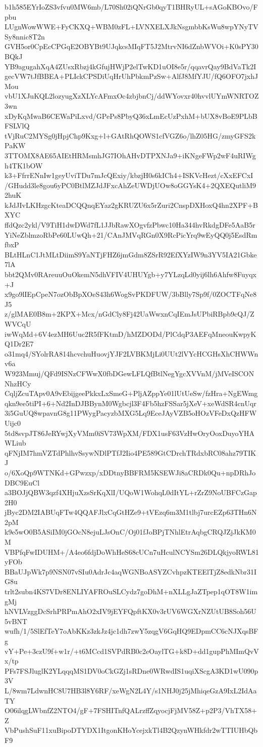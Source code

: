 b1h585EYrIoZS3vfvu0MW6mb/L70Sh02iQNrGb0qyT1BHRyUL+sAGoKBOvo/Fpbu
LUgnWowWWE+FyCKXQ+WBM0zFL+LVNXELXJkNsgmbbKsWu8wpYNyTVSy8nnic8T2n
GVH5or0CpEcCPGqE2OBYBt9UJqkcsMIqFT5J2MtrvNI6dZnbWVOi+K0sPY30BQkJ
YB9agugahXqA4ZUsxRbzj4kGfujHWjP2elTwKD1uOI8e5r/qqavrQay9BdVaTk2I
gecVW7tJfBBEA+PLIckCPSDiUqHrUhPbkmPzSw+AlfJ8MfYJU/fQ6OFO7jxhJMou
vbU1XJuKQL2lozyugXzXLYcAFmxOc4zbjbnCj/ddWYovxr40hvvlUYmWNRTOZ3wn
xDyKqMwaB6CEWaPiLxvd/GPePs8PbyQ36xLmEcUzPxhM+bUX8vBoE9PLbBFSLVlQ
tVjRuC2MYSg0jHpjChp9Kxg+l+GAtRhQOWS1cfVGZ6o/lhZ05HG/zmyGFS2kPaKW
3TTOMX8AE65AIEtHRMsmhJG7IOhAHvDTPXNJa9+iKNgeFWp2wF4uRIWgh4TK1bOW
k3+FfrrENnIw1geyUviTDu7mJcQExiy/kbzjH0s6kICh4+ISKVcHezt/cXxEFCxI
/GHudd3le8gou6yPC0BtlMZJdJFxcAhZeUWDjUOw8oGGYsK4+2QXEQutliM92huK
kJdJIvLKHzgcKteaDCQQnqEYaz2gKRUZU6x5rZuri2CnspDXHoxQ4hn2XPF+BXYC
ffdQzc2ykl/V9TiH1dwDWd7fL1JJbRawXOgvfzPbwc10Ha344hvRkdgDFe5AaB5r
YiNeZblmzoRbPe60LUwQh+21/CAnJMVqRGn0X9RcPicYrq9wEyQQ0j5EsdRmfbxP
BLtHLnC1JtMLtDiimS9YaNTjFHZ6jmGdm8ZSrR92EfXYzIW9n3YV5IA21Gbke7lA
bbt2QMv0RAreuuOuOkemN5dhVFIV4UHUYgb+y7YLzqLd0yij6lh6Ahfw8Fuyqx+J
x9go9lIEpCpeN7ozObBpXOeS43h6WogSvPKDFUW/3bBlly7Sp9f/0ZOCTFqNe8J5
z/glMAE0B8m+2KPX+Mcx/nGdCly8Fj42UaWwxnCqIEmJsUPbiRBpb9cQJ/ZWVCqU
iwWqMd+6V4ezMH6Uuc2R5fFKtmD/hMZDODd/PlCdqP3AEFqMneouKwpyKQ1Dr2E7
o31mq4/SYolrRA814hcvchuHuovjYJF2LVBKMjLi0UUt2lVYcHCGHsXhCHWWnv6a
W923Mmuj/QFd9ISNzCFWwX0fbDGewLFLQfBtlNegYgcXVVnM/jMVeISCONNhzHCy
CqljZcuTApv0A9vEbijgeePkkxLxSmeG+PljAZppYe01lUtUeSw/fzHra+NgEWmg
qkn9ee5tiPI+6+Nd2InDJBBynM0Wgbcjl3F4Fb5hzFSSar5jXeV+xeWdSR4cnUqr
3i5GuUQ8wpavnG8g11PWygPacyzbMXG5Lq9EceJAyVZB5oHOzVFeDxQzHFWUijc0
5td8svpJT86JeRYwjXyVMm0iSV73WpXM/FDX1usF63VzHwOryOoxDuyoYHAWLiub
qFNjIM7hmVZTdPhlhvSsywNDlPTfJ2Iio4PE589GtCDrchTRdxbRC08ahz79TIKJ
o/6XoQp9WTNKd+GPwzxp/xDDtnyBBFRM5KSEWJi8aCRDk0Qu+npDRhJoDBC9EuCl
a3BOJjQBW3qzf4XHjuXzsSrKqXlI/UQoW1WohqL0dItYL+rZrZ9NoUBFCzGap2H0
jByc2DM2IABUqFTw4QQAFJlxCqGtHZe9+tVEzq6m3M1tlbj7urcEZp63THn6N2pM
k9e5wO0B5ASiIM0jGOcN8ejuLJsOnC/Oj01fJoBPjTNhlEtrAqbgCRQJZjJkKM0M
VBPfqFwIDUHM+/A4eo6fdjDoWhHeS68cUCn7uHculNCYSm26DLQkjyoRWL81yFOb
BBaUJpWk7p9NSN07vSIu0AdrJc4aqWGNBoASYZCvhpzKTEElTjZ8edkNbr31IG8u
trlt2subn4KS7VDr8ENLIYAFROuSLCydz7goDhM+nXLLgJaZTpep1qOT8W1imgMj
hNVLVzggDcSrhPRPmAhO2xIV9jEYFQpftKX0v3rUV6WGXrNZUtUB8Soh56U5vBNT
wufh/1/5SlEfTeY7oAbKKz3zkJz4jc1dh7zwY5zqgV6GqHQ9EDpmCC6cNJXqsBFg
vY+Pe+3czU9f+w1r/+t6MCcd1SVPdRB0c2eOaylTG+k8D+dd1gupPhMImQvVx/tp
PFs7FSJluglK2YLqqqMS1DV0oCkGZj1sRDne0WRwdIS1uqiXScgA3KD1wU090p3V
L/8wm7LdwnHC8U7HB3l8Y6RF/xeWgN2L4Y/s1NHJ0j25jMhiqeGzA9IxL2IdAaTY
O06ilqgLWbnfZ2NTO4/gF+7FSHITnfQALrzffZqyocjFjMV58Z+p2P3/VhTX58+Z
VbPushSuF11xuBipoDTYDX1ItgonKHoYcejxkTl4B2QzynWHkfdr2wTTIUHbQbF9
